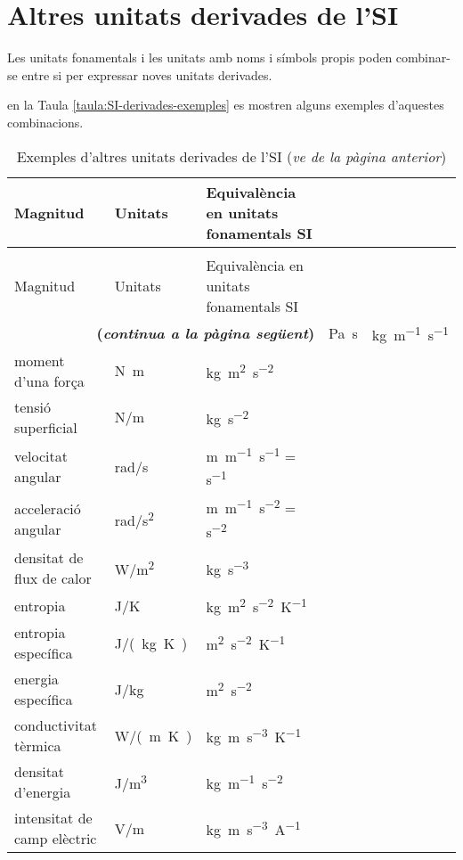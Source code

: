 \section{Altres unitats derivades de l'SI}

Les unitats fonamentals i les unitats amb noms i símbols propis poden combinar-se entre si per expressar noves unitats derivades.

 en la Taula \vref{taula:SI-derivades-exemples} es mostren alguns exemples d'aquestes combinacions.

\begin{longtable}[h]{lll}
   \caption{\label{taula:SI-derivades-exemples} Exemples d'altres unitats derivades de
   l'SI}\\
   \toprule[1pt]
    Magnitud &  Unitats & Equivalència en unitats fonamentals SI\\
   \midrule
   \endfirsthead
   \caption[]{Exemples d'altres unitats derivades de l'SI (\emph{ve de la pàgina
   anterior})}\\
   \toprule[1pt]
    Magnitud &  Unitats & Equivalència en unitats fonamentals SI\\
   \midrule
   \endhead
   \midrule
   \multicolumn{3}{r}{\sffamily\bfseries\color{NavyBlue}(\emph{continua a la pàgina següent})}
   \endfoot
   \endlastfoot
   viscositat dinàmica &  \si{Pa.s}& \si{kg.m^{-1}.s^{-1}} \\
   moment d'una força & \si{N.m} & \si{kg.m^2.s^{-2}} \\
   tensió superficial &  \si{N/m} &   \si{kg.s^{-2}} \\
   velocitat angular & \si{rad/s} & \si{m.m^{-1}.s^{-1}} = \si{s^{-1}} \\
   acceleració angular & \si{rad/s^2} & \si{m.m^{-1}.s^{-2}} = \si{s^{-2}} \\
   densitat de flux de calor & \si{W/m^2} & \si{kg.s^{-3}} \\
   entropia & \si{J/K} & \si{kg.m^2.s^{-2}.K^{-1}} \\
   entropia específica & \si{J/(kg.K)} &\si{m^2.s^{-2}.K^{-1}} \\
   energia específica & \si{J/kg} & \si{m^2.s^{-2}} \\
   conductivitat tèrmica & \si{W/(m.K)} & \si{kg.m.s^{-3}.K^{-1}} \\
   densitat d'energia & \si{J/m^3} & \si{kg.m^{-1}.s^{-2}} \\
   intensitat de camp elèctric & \si{V/m}& \si{kg.m.s^{-3}.A^{-1}}  \\

\end{longtable}
